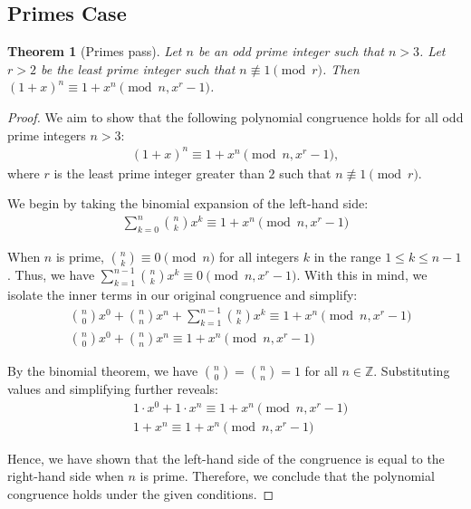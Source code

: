 \documentclass{article}
\theoremstyle{plain}
\theoremstyle{definition}
\newtheorem{theorem}{Theorem}
\newcommand{\D}{r}
\begin{document}
\subsection{Primes Case}
\begin{theorem}[Primes pass] \label{theorem:primes}
\textit{Let $n$ be an odd prime integer such that $n > 3$. Let $\D > 2$ be the least prime integer such that $n \not\equiv 1 \pmod{\D}$. Then $(1 + x)^n \equiv 1 + x^n \pmod{n, x^\D - 1}$.}
\end{theorem}
\begin{proof}
We aim to show that the following polynomial congruence holds for all odd prime integers $n > 3$:
\begin{align}
    (1 + x)^n \equiv 1 + x^n \pmod{n, x^\D - 1},
\end{align}
where $\D$ is the least prime integer greater than $2$ such that $n \not\equiv 1 \pmod{\D}$.

We begin by taking the binomial expansion of the left-hand side:
\begin{align}
    \sum_{k=0}^{n} \binom{n}{k} x^k \equiv 1 + x^n \pmod{n, x^\D - 1}
\end{align}

When $n$ is prime, $\binom{n}{k} \equiv 0 \pmod{n}$ for all integers $k$ in the range $1 \leq k \leq n-1$. Thus, we have $\sum_{k=1}^{n-1} \binom{n}{k} x^k \equiv 0 \pmod{n, x^\D - 1}$. With this in mind, we isolate the inner terms in our original congruence and simplify:
\begin{align}
    & \binom{n}{0} x^0 + \binom{n}{n} x^n + \sum_{k=1}^{n-1} \binom{n}{k} x^k \equiv 1 + x^n \pmod{n, x^\D - 1} \\
    & \binom{n}{0} x^0 + \binom{n}{n} x^n \equiv 1 + x^n \pmod{n, x^\D - 1}
\end{align}

By the binomial theorem, we have $\binom{n}{0} = \binom{n}{n} = 1$ for all $n \in \mathbb{Z}$. Substituting values and simplifying further reveals:
\begin{align}
    & 1 \cdot x^0 + 1 \cdot x^n \equiv 1 + x^n \pmod{n, x^\D - 1} \\
    & 1 + x^n \equiv 1 + x^n \pmod{n, x^\D - 1}
\end{align}

Hence, we have shown that the left-hand side of the congruence is equal to the right-hand side when $n$ is prime. Therefore, we conclude that the polynomial congruence holds under the given conditions.
\end{proof}
\end{document}
